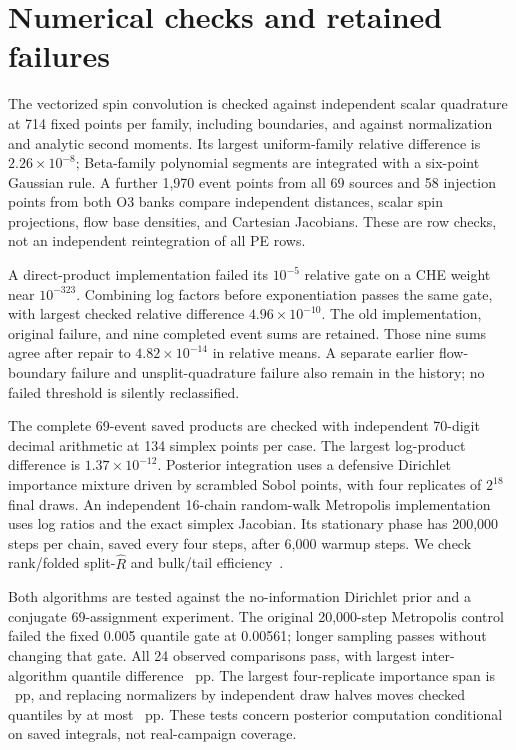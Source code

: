 \section{Numerical checks and retained failures}
The vectorized spin convolution is checked against independent scalar quadrature at 714 fixed points per family, including boundaries, and against normalization and analytic second moments. Its largest uniform-family relative difference is $2.26\times10^{-8}$; Beta-family polynomial segments are integrated with a six-point Gaussian rule. A further 1,970 event points from all 69 sources and 58 injection points from both O3 banks compare independent distances, scalar spin projections, flow base densities, and Cartesian Jacobians. These are row checks, not an independent reintegration of all PE rows.

A direct-product implementation failed its $10^{-5}$ relative gate on a CHE weight near $10^{-323}$. Combining log factors before exponentiation passes the same gate, with largest checked relative difference $4.96\times10^{-10}$. The old implementation, original failure, and nine completed event sums are retained. Those nine sums agree after repair to $4.82\times10^{-14}$ in relative means. A separate earlier flow-boundary failure and unsplit-quadrature failure also remain in the history; no failed threshold is silently reclassified.

The complete 69-event saved products are checked with independent 70-digit decimal arithmetic at 134 simplex points per case. The largest log-product difference is $1.37\times10^{-12}$. Posterior integration uses a defensive Dirichlet importance mixture driven by scrambled Sobol points, with four replicates of $2^{18}$ final draws. An independent 16-chain random-walk Metropolis implementation uses log ratios and the exact simplex Jacobian. Its stationary phase has 200,000 steps per chain, saved every four steps, after 6,000 warmup steps. We check rank/folded split-$\widehat R$ and bulk/tail efficiency~\cite{vehtari}.

Both algorithms are tested against the no-information Dirichlet prior and a conjugate 69-assignment experiment. The original 20,000-step Metropolis control failed the fixed 0.005 quantile gate at 0.00561; longer sampling passes without changing that gate. All 24 observed comparisons pass, with largest inter-algorithm quantile difference \MaxIndependent\ pp. The largest four-replicate importance span is \MaxReplicate\ pp, and replacing normalizers by independent draw halves moves checked quantiles by at most \MaxNormHalf\ pp. These tests concern posterior computation conditional on saved integrals, not real-campaign coverage.

